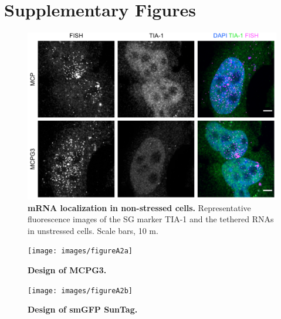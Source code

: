 \chapter{Supplementary Figures}

\begin{figure}[h]
    \centering
    \includegraphics[width=\linewidth]{images/figureA1}
    \caption{\textbf{mRNA localization in non-stressed cells.}
            Representative fluorescence images of the SG marker
            TIA-1 and the tethered RNAs in unstressed cells.
            Scale bars, 10 \textmu m.}
    \label{fig:mcp_supplement}
\end{figure}

\begin{figure}[h]
    \centering
    \texttt{[image: images/figureA2a]}
    \caption{\textbf{Design of MCPG3.}}
    \label{fig:plasmid_1}
\end{figure}

\begin{figure}[h]
    \centering
    \texttt{[image: images/figureA2b]}
    \caption{\textbf{Design of smGFP SunTag.}}
    \label{fig:plasmid_2}
\end{figure}
